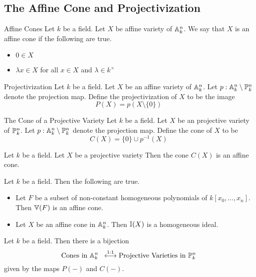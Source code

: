 \documentclass[a4paper]{article}
\begin{document}
\subsection{The Affine Cone and Projectivization}
\begin{defn}{Affine Cones}{} Let $k$ be a field. Let $X$ be affine variety of $\mathbb{A}_k^n$. We say that $X$ is an affine cone if the following are true. 
\begin{itemize}
\item $0\in X$
\item $\lambda x\in X$ for all $x\in X$ and $\lambda\in k^\times$
\end{itemize}
\end{defn}

\begin{defn}{Projectivization}{} Let $k$ be a field. Let $X$ be an affine variety of $\mathbb{A}_k^n$. Let $p:\mathbb{A}_k^n\setminus\mathbb{P}_k^n$ denote the projection map. Define the projectivization of $X$ to be the image $$P(X)=p(X\setminus\{0\})$$
\end{defn}

\begin{defn}{The Cone of a Projective Variety}{} Let $k$ be a field. Let $X$ be an projective variety of $\mathbb{P}_k^n$. Let $p:\mathbb{A}_k^n\setminus\mathbb{P}_k^n$ denote the projection map. Define the cone of $X$ to be $$C(X)=\{0\}\cup p^{-1}(X)$$
\end{defn}

\begin{lmm}{}{} Let $k$ be a field. Let $X$ be a projective variety Then the cone $C(X)$ is an affine cone. 
\end{lmm}

\begin{lmm}{}{} Let $k$ be a field. Then the following are true. 
\begin{itemize}
\item Let $F$ be a subset of non-constant homogeneous polynomials of $k[x_0,\dots,x_n]$. Then $\mathbb{V}(F)$ is an affine cone. 
\item Let $X$ be an affine cone in $\mathbb{A}_k^n$. Then $\mathbb{I}(X)$ is a homogeneous ideal. 
\end{itemize}
\end{lmm}

\begin{prp}{}{} Let $k$ be a field. Then there is a bijection $$\text{Cones in }\mathbb{A}_k^n\;\;\overset{1:1}{\longleftrightarrow}\text{Projective Varieties in }\mathbb{P}_k^n$$ given by the maps $P(-)$ and $C(-)$. 
\end{prp}
\end{document}
